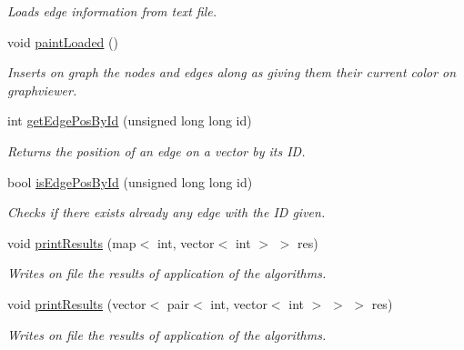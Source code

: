 \begin{DoxyCompactItemize}
\begin{DoxyCompactList}\small\item\em Loads edge information from text file. \end{DoxyCompactList}\item 
\hypertarget{class_supermarket_network_a81785ce5abea96016bcc06958a2eed8e}{}\label{class_supermarket_network_a81785ce5abea96016bcc06958a2eed8e} 
void \hyperlink{class_supermarket_network_a81785ce5abea96016bcc06958a2eed8e}{paint\+Loaded} ()
\begin{DoxyCompactList}\small\item\em Inserts on graph the nodes and edges along as giving them their current color on graphviewer. \end{DoxyCompactList}\item 
\hypertarget{class_supermarket_network_a5d7c2badb6cb2f4ded2942e861912a78}{}\label{class_supermarket_network_a5d7c2badb6cb2f4ded2942e861912a78} 
int \hyperlink{class_supermarket_network_a5d7c2badb6cb2f4ded2942e861912a78}{get\+Edge\+Pos\+By\+Id} (unsigned long long id)
\begin{DoxyCompactList}\small\item\em Returns the position of an edge on a vector by it\textquotesingle{}s ID. \end{DoxyCompactList}\item 
\hypertarget{class_supermarket_network_add014a6408078bfbf46832892858a936}{}\label{class_supermarket_network_add014a6408078bfbf46832892858a936} 
bool \hyperlink{class_supermarket_network_add014a6408078bfbf46832892858a936}{is\+Edge\+Pos\+By\+Id} (unsigned long long id)
\begin{DoxyCompactList}\small\item\em Checks if there exists already any edge with the ID given. \end{DoxyCompactList}\item 
void \hyperlink{class_supermarket_network_a013ba8bf6d961cc2fefa0fa09bf8a2e7}{print\+Results} (map$<$ int, vector$<$ int $>$ $>$ res)
\begin{DoxyCompactList}\small\item\em Writes on file the results of application of the algorithms. \end{DoxyCompactList}\item 
void \hyperlink{class_supermarket_network_adb6dd660ec70427802da4e18f96d725d}{print\+Results} (vector$<$ pair$<$ int, vector$<$ int $>$ $>$ $>$ res)
\begin{DoxyCompactList}\small\item\em Writes on file the results of application of the algorithms. \end{DoxyCompactList}\item 

\end{DoxyCompactItemize}
